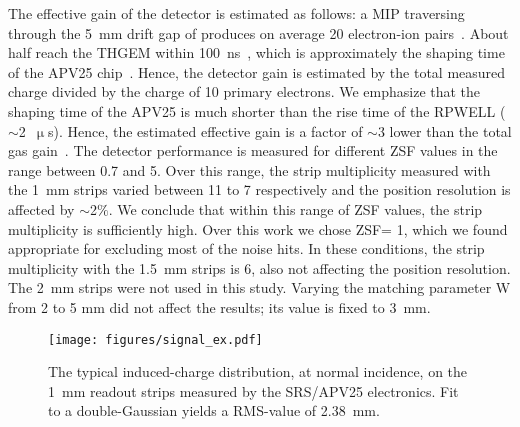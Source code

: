 The effective gain of the detector is estimated as follows: a MIP traversing through the 5~mm drift gap of \nech produces on average 20 electron-ion pairs~\cite{sauli2014gaseous}. About half reach the THGEM within 100~ns~\cite{peisert1984drift}, which is approximately the shaping time of the APV25 chip~\cite{french2001design}. Hence, the detector gain is estimated by the total measured charge divided by the charge of 10 primary electrons. We emphasize that the shaping time of the APV25 is much shorter than the rise time of the RPWELL ($\sim$2~$\upmu$s). Hence, the estimated effective gain is a factor of $\sim$3 lower than the total gas gain~\cite{rubin2013first}. 
The detector performance is measured for different ZSF values in the range between 0.7 and 5. Over this range, the strip multiplicity measured with the 1~mm strips varied between 11 to 7 respectively and the position resolution is affected by $\sim$2$\%$. We conclude that within this range of ZSF values, the strip multiplicity is sufficiently high. Over this work we chose ZSF= 1, which we found appropriate for excluding most of the noise hits. In these conditions, the strip multiplicity with the 1.5~mm strips is 6, also not affecting the position resolution. The 2~mm strips were not used in this study. Varying the matching parameter W from 2 to 5 mm did not affect the results; its value is fixed to 3~mm. 

\begin{figure}[h]
\centering
\texttt{[image: figures/signal\_ex.pdf]}
\caption{The typical induced-charge distribution, at normal incidence, on the 1~mm readout strips measured by the SRS/APV25 electronics. Fit to a double-Gaussian yields a RMS-value of 2.38~mm.}\label{fig: induced signal}
\end{figure}
